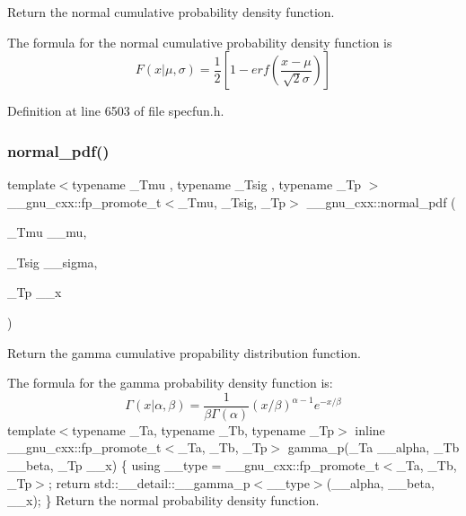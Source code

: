 Return the normal cumulative probability density function. 

The formula for the normal cumulative probability density function is \[ F(x|\mu,\sigma) = \frac{1}{2}\left[ 1-erf(\frac{x-\mu}{\sqrt{2}\sigma}) \right] \] 

Definition at line 6503 of file specfun.\+h.

\mbox{\label{group__gnu__math__spec__func_gab795379781dea732cbc7556351760401}} 
\subsubsection{\texorpdfstring{normal\+\_\+pdf()}{normal\_pdf()}}
{\footnotesize\ttfamily template$<$typename \+\_\+\+Tmu , typename \+\_\+\+Tsig , typename \+\_\+\+Tp $>$ \\
\+\_\+\+\_\+gnu\+\_\+cxx\+::fp\+\_\+promote\+\_\+t$<$\+\_\+\+Tmu, \+\_\+\+Tsig, \+\_\+\+Tp$>$ \+\_\+\+\_\+gnu\+\_\+cxx\+::normal\+\_\+pdf (\begin{DoxyParamCaption}\item[{\+\_\+\+Tmu}]{\+\_\+\+\_\+mu,  }\item[{\+\_\+\+Tsig}]{\+\_\+\+\_\+sigma,  }\item[{\+\_\+\+Tp}]{\+\_\+\+\_\+x }\end{DoxyParamCaption})\hspace{0.3cm}{\ttfamily [inline]}}



Return the gamma cumulative propability distribution function. 

The formula for the gamma probability density function is\+: \[ \Gamma(x|\alpha,\beta) = \frac{1}{\beta\Gamma(\alpha)} (x/\beta)^{\alpha - 1} e^{-x/\beta} \] template$<$typename \+\_\+\+Ta, typename \+\_\+\+Tb, typename \+\_\+\+Tp$>$ inline \+\_\+\+\_\+gnu\+\_\+cxx\+::fp\+\_\+promote\+\_\+t$<$\+\_\+\+Ta, \+\_\+\+Tb, \+\_\+\+Tp$>$ gamma\+\_\+p(\+\_\+\+Ta \+\_\+\+\_\+alpha, \+\_\+\+Tb \+\_\+\+\_\+beta, \+\_\+\+Tp \+\_\+\+\_\+x) \{ using \+\_\+\+\_\+type = \+\_\+\+\_\+gnu\+\_\+cxx\+::fp\+\_\+promote\+\_\+t$<$\+\_\+\+Ta, \+\_\+\+Tb, \+\_\+\+Tp$>$; return std\+::\+\_\+\+\_\+detail\+::\+\_\+\+\_\+gamma\+\_\+p$<$\+\_\+\+\_\+type$>$(\+\_\+\+\_\+alpha, \+\_\+\+\_\+beta, \+\_\+\+\_\+x); \} Return the normal probability density function.

